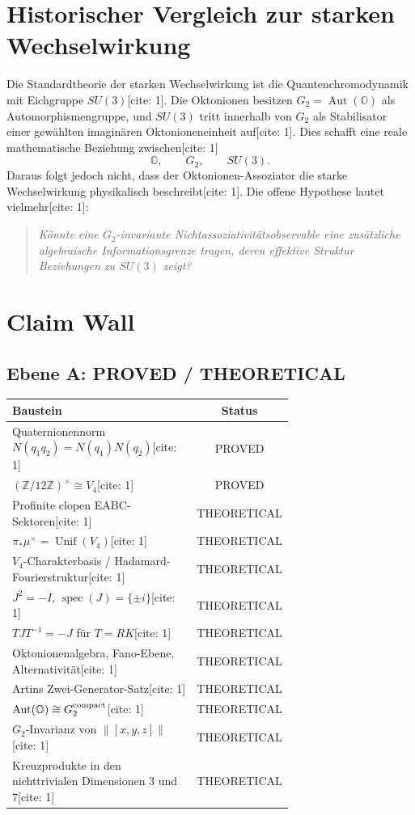 \documentclass[11pt,a4paper]{article}
\newcommand{\OO}{\mathbb{O}}
\newcommand{\ZZ}{\mathbb{Z}}
\newcommand{\norm}[1]{\left\lVert #1 \right\rVert}
\newcommand{\Aut}{\operatorname{Aut}}
\newcommand{\Unif}{\operatorname{Unif}}
\begin{document}
\section{Historischer Vergleich zur starken Wechselwirkung}
Die Standardtheorie der starken Wechselwirkung ist die Quantenchromodynamik mit Eichgruppe $SU(3)$[cite: 1]. Die Oktonionen besitzen $G_2=\Aut(\OO)$ als Automorphismengruppe, und $SU(3)$ tritt innerhalb von $G_2$ als Stabilisator einer gewählten imaginären Oktonioneneinheit auf[cite: 1]. Dies schafft eine reale mathematische Beziehung zwischen[cite: 1]
\[
\OO,\qquad G_2,\qquad SU(3).
\]
Daraus folgt jedoch nicht, dass der Oktonionen-Assoziator die starke Wechselwirkung physikalisch beschreibt[cite: 1]. Die offene Hypothese lautet vielmehr[cite: 1]:
\begin{quote}
\emph{Könnte eine $G_2$-invariante Nichtassoziativitätsobservable eine zusätzliche algebraische Informationsgrenze tragen, deren effektive Struktur Beziehungen zu $SU(3)$ zeigt?}
\end{quote}

\section{Claim Wall}
\subsection*{Ebene A: PROVED / THEORETICAL}
\begin{center}
\begin{tabular}{>{\raggedright\arraybackslash}p{0.69\linewidth}|c}
\toprule
\textbf{Baustein} & \textbf{Status}\\
\midrule
Quaternionennorm $N(q_1q_2)=N(q_1)N(q_2)$[cite: 1] & PROVED\\
$(\ZZ/12\ZZ)^\times\cong V_4$[cite: 1] & PROVED\\
Profinite clopen EABC-Sektoren[cite: 1] & THEORETICAL\\
$\pi_*\mu^\times=\Unif(V_4)$[cite: 1] & THEORETICAL\\
$V_4$-Charakterbasis / Hadamard-Fourierstruktur[cite: 1] & THEORETICAL\\
$J^2=-I$, $\operatorname{spec}(J)=\{\pm i\}$[cite: 1] & THEORETICAL\\
$TJT^{-1}=-J$ für $T=RK$[cite: 1] & THEORETICAL\\
Oktonionenalgebra, Fano-Ebene, Alternativität[cite: 1] & THEORETICAL\\
Artins Zwei-Generator-Satz[cite: 1] & THEORETICAL\\
$\Aut(\OO)\cong G_2^{\rm compact}$[cite: 1] & THEORETICAL\\
$G_2$-Invarianz von $\norm{[x,y,z]}$[cite: 1] & THEORETICAL\\
Kreuzprodukte in den nichttrivialen Dimensionen $3$ und $7$[cite: 1] & THEORETICAL\\
\bottomrule
\end{tabular}
\end{center}
\end{document}
